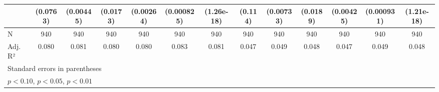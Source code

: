 {\begin{tabular}{l*{12}{c}}
                    &    (0.0763)         &   (0.00445)         &    (0.0173)         &   (0.00264)         &  (0.000825)         &  (1.26e-18)         &     (0.114)         &   (0.00733)         &    (0.0189)         &   (0.00425)         &  (0.000931)         &  (1.21e-18)         \\
\hline
N                   &         940         &         940         &         940         &         940         &         940         &         940         &         940         &         940         &         940         &         940         &         940         &         940         \\
Adj. R²             &       0.080         &       0.081         &       0.080         &       0.080         &       0.083         &       0.081         &       0.047         &       0.049         &       0.048         &       0.047         &       0.049         &       0.048         \\
\hline\hline
\multicolumn{13}{l}{\footnotesize Standard errors in parentheses}\\
\multicolumn{13}{l}{\footnotesize \sym{*} \(p<0.10\), \sym{**} \(p<0.05\), \sym{***} \(p<0.01\)}\\
\end{tabular}
}
